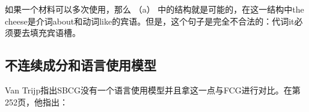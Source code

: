 \eal
{}
\zl
如果一个材料可以多次使用，那么 （a） 中的结构就是可能的，在这一结构中the cheese是介词about和动词like的宾语。但是，这个句子是完全不合法的：代词it必须要去填充宾语槽。

\subsection{不连续成分和语言使用模型}

Van Trijp指出SBCG没有一个语言使用模型并且拿这一点与FCG进行对比。在第252页，他指出：

